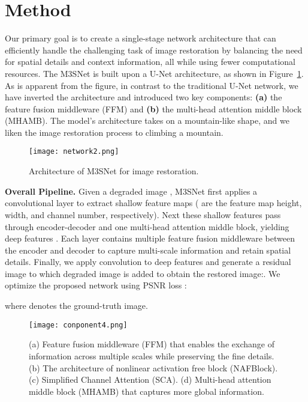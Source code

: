 \documentclass[sn-mathphys,Numbered]{sn-jnl}
\theoremstyle{thmstyleone}\newtheorem{theorem}{Theorem}\newtheorem{proposition}[theorem]{Proposition}
\theoremstyle{thmstyletwo}\newtheorem{example}{Example}\newtheorem{remark}{Remark}
\theoremstyle{thmstylethree}\newtheorem{definition}{Definition}
\begin{document}
\section{Method}
Our primary goal is to create a single-stage network architecture that can efficiently handle the challenging task of image restoration by balancing the need for spatial details and context information, all while using fewer computational resources. The M3SNet is built upon a U-Net architecture, as shown in Figure~\ref{fig:02}. As is apparent from the figure, in contrast to the traditional U-Net network, we have inverted the architecture and introduced two key components: \textbf{(a)} the feature fusion middleware (FFM) and \textbf{(b)} the multi-head attention middle block (MHAMB). The model's architecture takes on a mountain-like shape, and we liken the image restoration process to climbing a mountain. 
\begin{figure}[tb] \centering
	\texttt{[image: network2.png]}
	\caption{Architecture of M3SNet for image restoration.}
	\label{fig:02}
\end{figure}

\noindent\textbf{Overall Pipeline.} Given a degraded image , M3SNet first applies a  convolutional layer to extract shallow feature maps  ( are the feature map height, width, and channel number, respectively). Next these shallow features  pass through  encoder-decoder and one multi-head attention middle block, yielding deep features . Each layer contains multiple feature fusion middleware between the encoder and decoder to capture multi-scale information and retain spatial details. 
Finally, we apply convolution to deep  features  and generate a residual image  to which degraded image is added to obtain the restored image:. We optimize the proposed network using PSNR loss : 




\noindent where  denotes the ground-truth image.
\begin{figure}[tb] \centering
	\texttt{[image: conponent4.png]}
	\caption{(a) Feature fusion middleware (FFM) that enables the exchange of information across multiple scales while preserving the fine details. (b) The architecture of nonlinear activation free block (NAFBlock). (c) Simplified Channel Attention (SCA). (d) Multi-head attention middle block (MHAMB) that  captures more global information.}
	\label{fig:03}
\end{figure}
\end{document}
